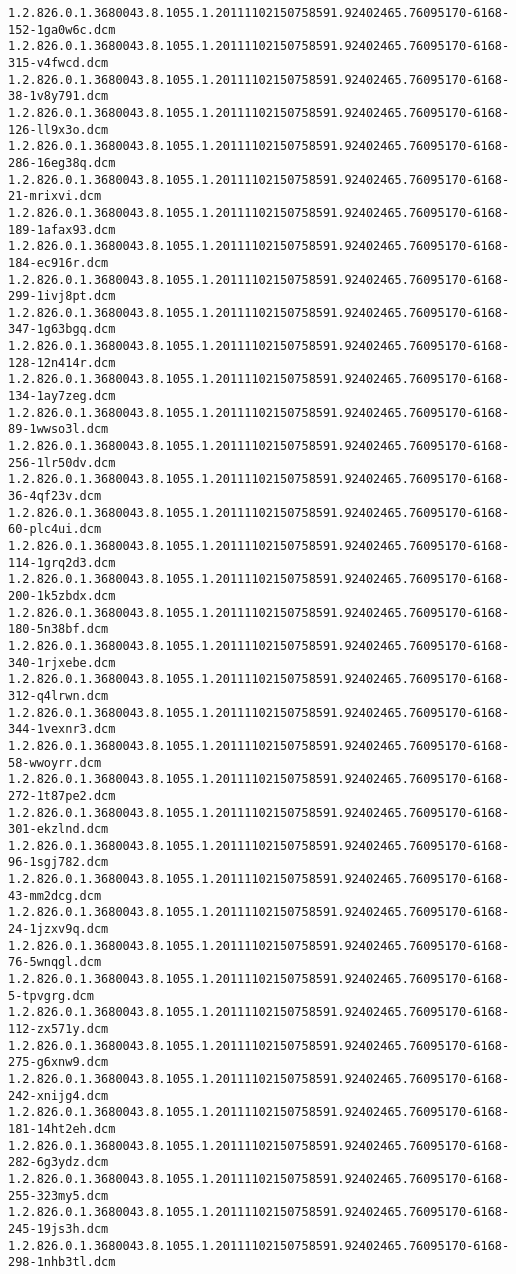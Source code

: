 \begin{lstlisting}
1.2.826.0.1.3680043.8.1055.1.20111102150758591.92402465.76095170-6168-152-1ga0w6c.dcm 1.2.826.0.1.3680043.8.1055.1.20111102150758591.92402465.76095170-6168-315-v4fwcd.dcm 1.2.826.0.1.3680043.8.1055.1.20111102150758591.92402465.76095170-6168-38-1v8y791.dcm 1.2.826.0.1.3680043.8.1055.1.20111102150758591.92402465.76095170-6168-126-ll9x3o.dcm 1.2.826.0.1.3680043.8.1055.1.20111102150758591.92402465.76095170-6168-286-16eg38q.dcm 1.2.826.0.1.3680043.8.1055.1.20111102150758591.92402465.76095170-6168-21-mrixvi.dcm 1.2.826.0.1.3680043.8.1055.1.20111102150758591.92402465.76095170-6168-189-1afax93.dcm 1.2.826.0.1.3680043.8.1055.1.20111102150758591.92402465.76095170-6168-184-ec916r.dcm 1.2.826.0.1.3680043.8.1055.1.20111102150758591.92402465.76095170-6168-299-1ivj8pt.dcm 1.2.826.0.1.3680043.8.1055.1.20111102150758591.92402465.76095170-6168-347-1g63bgq.dcm 1.2.826.0.1.3680043.8.1055.1.20111102150758591.92402465.76095170-6168-128-12n414r.dcm 1.2.826.0.1.3680043.8.1055.1.20111102150758591.92402465.76095170-6168-134-1ay7zeg.dcm 1.2.826.0.1.3680043.8.1055.1.20111102150758591.92402465.76095170-6168-89-1wwso3l.dcm 1.2.826.0.1.3680043.8.1055.1.20111102150758591.92402465.76095170-6168-256-1lr50dv.dcm 1.2.826.0.1.3680043.8.1055.1.20111102150758591.92402465.76095170-6168-36-4qf23v.dcm 1.2.826.0.1.3680043.8.1055.1.20111102150758591.92402465.76095170-6168-60-plc4ui.dcm 1.2.826.0.1.3680043.8.1055.1.20111102150758591.92402465.76095170-6168-114-1grq2d3.dcm 1.2.826.0.1.3680043.8.1055.1.20111102150758591.92402465.76095170-6168-200-1k5zbdx.dcm 1.2.826.0.1.3680043.8.1055.1.20111102150758591.92402465.76095170-6168-180-5n38bf.dcm 1.2.826.0.1.3680043.8.1055.1.20111102150758591.92402465.76095170-6168-340-1rjxebe.dcm 1.2.826.0.1.3680043.8.1055.1.20111102150758591.92402465.76095170-6168-312-q4lrwn.dcm 1.2.826.0.1.3680043.8.1055.1.20111102150758591.92402465.76095170-6168-344-1vexnr3.dcm 1.2.826.0.1.3680043.8.1055.1.20111102150758591.92402465.76095170-6168-58-wwoyrr.dcm 1.2.826.0.1.3680043.8.1055.1.20111102150758591.92402465.76095170-6168-272-1t87pe2.dcm 1.2.826.0.1.3680043.8.1055.1.20111102150758591.92402465.76095170-6168-301-ekzlnd.dcm 1.2.826.0.1.3680043.8.1055.1.20111102150758591.92402465.76095170-6168-96-1sgj782.dcm 1.2.826.0.1.3680043.8.1055.1.20111102150758591.92402465.76095170-6168-43-mm2dcg.dcm 1.2.826.0.1.3680043.8.1055.1.20111102150758591.92402465.76095170-6168-24-1jzxv9q.dcm 1.2.826.0.1.3680043.8.1055.1.20111102150758591.92402465.76095170-6168-76-5wnqgl.dcm 1.2.826.0.1.3680043.8.1055.1.20111102150758591.92402465.76095170-6168-5-tpvgrg.dcm 1.2.826.0.1.3680043.8.1055.1.20111102150758591.92402465.76095170-6168-112-zx571y.dcm 1.2.826.0.1.3680043.8.1055.1.20111102150758591.92402465.76095170-6168-275-g6xnw9.dcm 1.2.826.0.1.3680043.8.1055.1.20111102150758591.92402465.76095170-6168-242-xnijg4.dcm 1.2.826.0.1.3680043.8.1055.1.20111102150758591.92402465.76095170-6168-181-14ht2eh.dcm 1.2.826.0.1.3680043.8.1055.1.20111102150758591.92402465.76095170-6168-282-6g3ydz.dcm 1.2.826.0.1.3680043.8.1055.1.20111102150758591.92402465.76095170-6168-255-323my5.dcm 1.2.826.0.1.3680043.8.1055.1.20111102150758591.92402465.76095170-6168-245-19js3h.dcm 1.2.826.0.1.3680043.8.1055.1.20111102150758591.92402465.76095170-6168-298-1nhb3tl.dcm 
\end{lstlisting}
